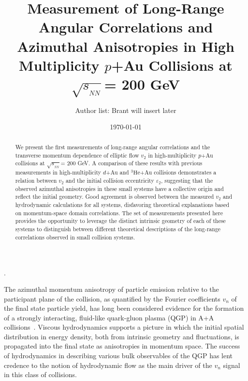 \documentclass[%
reprint,
showpacs,preprintnumbers,
 amsmath,amssymb,
 aps,
]{revtex4-1}
\newcommand{\sqsn}{\mbox{$\sqrt{s_{_{NN}}}$}\xspace}
\newcommand{\dau}{\mbox{$d$+Au}\xspace}
\newcommand{\pau}{\mbox{$p$+Au}\xspace}
\newcommand{\hau}{\mbox{$^3\text{He}$+Au}\xspace}
\begin{document}
\title{Measurement of Long-Range Angular Correlations and Azimuthal Anisotropies in High Multiplicity \pau Collisions at \sqsn = 200 GeV}%

\author{Author list: Brant will insert later}

\date{\today}%

\begin{abstract}
We present the first measurements of long-range angular correlations and the transverse momentum dependence of elliptic flow $v_2$ in high-multiplicity \pau collisions at \sqsn = 200 GeV. A comparison of these results with previous measurements in high-multiplicity \dau and \hau collisions demonstrates a relation between $v_2$ and the initial collision eccentricity $\varepsilon_2$, suggesting that the observed azimuthal anisotropies in these small systems have a collective origin and reflect the initial geometry. Good agreement is observed between the measured $v_2$ and hydrodynamic calculations for all systems, disfavoring theoretical explanations based on momentum-space domain correlations. The set of measurements presented here provides the opportunity to leverage the distinct intrinsic geometry of each of these systems to distinguish between different theoretical descriptions of the long-range correlations observed in small collision systems. 
\end{abstract}

\maketitle
.\clearpage

The azimuthal momentum anisotropy of particle emission relative to the participant plane of the collision, as quantified by the Fourier coefficients $v_n$ of the final state particle yield, has long been considered evidence for the formation of a strongly interacting, fluid-like quark-gluon plasma (QGP) in A+A collisions~\cite{Heinz:2013th}. Viscous hydrodynamics supports a picture in which the initial spatial distribution in energy density, both from intrinsic geometry and fluctuations, is propagated into the final state as anisotropies in momentum space. The success of hydrodynamics in describing various bulk observables of the QGP has lent credence to the notion of hydrodynamic flow as the main driver of the $v_{n}$ signal in this class of collisions.
\end{document}
